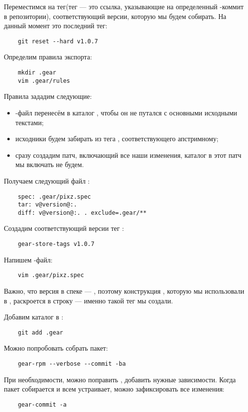 Переместимся на тег(тег --- это ссылка, указывающие на определенный -коммит в репозитории), соответствующий версии, которую мы будем собирать. На данный момент это последний тег: 
\begin{verbatim}
	git reset --hard v1.0.7
\end{verbatim}

Определим правила экспорта: 
\begin{verbatim}
	mkdir .gear
	vim .gear/rules
\end{verbatim}

Правила зададим следующие: 
\begin{itemize}
	\item {}-файл перенесём в каталог , чтобы он не путался с основными исходными текстами;
	\item исходники будем забирать из тега , соответствующего апстримному;
	\item сразу создадим патч, включающий все наши изменения, каталог  в этот патч мы включать не будем.
\end{itemize}

Получаем следующий файл :
\begin{verbatim}
	spec: .gear/pixz.spec
	tar: v@version@:.
	diff: v@version@:. . exclude=.gear/**
\end{verbatim}

Создадим соответствующий версии тег :
\begin{verbatim}
	gear-store-tags v1.0.7
\end{verbatim} 

Напишем -файл:
\begin{verbatim}
	vim .gear/pixz.spec
\end{verbatim} 

Важно, что версия в спеке --- , поэтому конструкция , которую мы использовали в , раскроется в строку  --- именно такой тег  мы создали. 

Добавим каталог  в :
\begin{verbatim}
	git add .gear
\end{verbatim} 

Можно попробовать собрать пакет: 
\begin{verbatim}
	gear-rpm --verbose --commit -ba
\end{verbatim}

При необходимости, можно поправить , добавить нужные зависимости. Когда пакет собирается и всем устраивает, можно зафиксировать все изменения: 
\begin{verbatim}
	gear-commit -a
\end{verbatim}